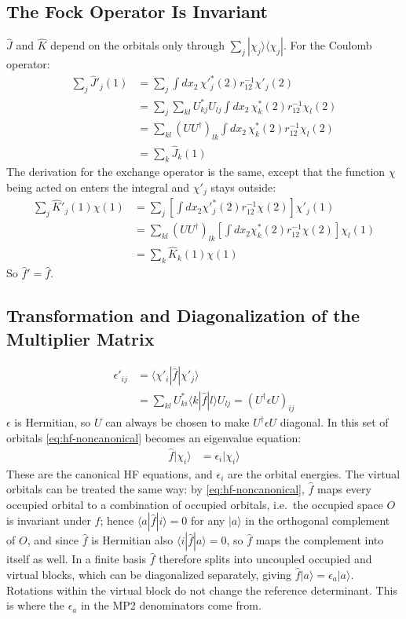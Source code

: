 \subsection{The Fock Operator Is Invariant}

$\hat{J}$ and $\hat{K}$ depend on the orbitals only through $\sum_j |\chi_j\rangle\langle\chi_j|$. For the Coulomb operator:
\begin{align*}
\sum_j \hat{J}'_j(1) &= \sum_j \int d x_2 \, \chi'^*_j(2) r_{12}^{-1} \chi'_j(2) \\
&= \sum_j \sum_{kl} U_{kj}^* U_{lj} \int d x_2 \, \chi_k^*(2) r_{12}^{-1} \chi_l(2) \\
&= \sum_{kl} (U U^\dagger)_{lk} \int d x_2 \, \chi_k^*(2) r_{12}^{-1} \chi_l(2) \\
&= \sum_k \hat{J}_k(1)
\end{align*}
The derivation for the exchange operator is the same, except that the function $\chi$ being acted on enters the integral and $\chi'_j$ stays outside:
\begin{align*}
\sum_j \hat{K}'_j(1) \chi(1) &= \sum_j \left[ \int dx_2 \chi'^*_j(2) r_{12}^{-1} \chi(2) \right] \chi'_j(1) \\
&= \sum_{kl} (U U^\dagger)_{lk} \left[ \int dx_2 \chi_k^*(2) r_{12}^{-1} \chi(2) \right] \chi_l(1) \\
&= \sum_k \hat{K}_k(1) \chi(1)
\end{align*}
So $\hat{f}' = \hat{f}$.

\subsection{Transformation and Diagonalization of the Multiplier Matrix}

\begin{align*}
\epsilon'_{ij} &= \langle \chi'_i | \hat{f} | \chi'_j \rangle \\
&= \sum_{kl} U_{ki}^* \langle k | \hat{f} | l \rangle U_{lj} = (U^\dagger \epsilon U)_{ij}
\end{align*}
$\epsilon$ is Hermitian, so $U$ can always be chosen to make $U^\dagger \epsilon U$ diagonal. In this set of orbitals \eqref{eq:hf-noncanonical} becomes an eigenvalue equation:
\begin{align}\label{eq:hf-canonical}
\hat{f} | \chi_i \rangle &= \epsilon_i | \chi_i \rangle
\end{align}
These are the canonical HF equations, and $\epsilon_i$ are the orbital energies. The virtual orbitals can be treated the same way: by \eqref{eq:hf-noncanonical}, $\hat{f}$ maps every occupied orbital to a combination of occupied orbitals, i.e.\ the occupied space $O$ is invariant under $\hat{f}$; hence $\langle a|\hat{f}|i\rangle = 0$ for any $|a\rangle$ in the orthogonal complement of $O$, and since $\hat{f}$ is Hermitian also $\langle i|\hat{f}|a\rangle = 0$, so $\hat{f}$ maps the complement into itself as well. In a finite basis $\hat{f}$ therefore splits into uncoupled occupied and virtual blocks, which can be diagonalized separately, giving $\hat{f} |a\rangle = \epsilon_a |a\rangle$. Rotations within the virtual block do not change the reference determinant. This is where the $\epsilon_a$ in the MP2 denominators come from.

